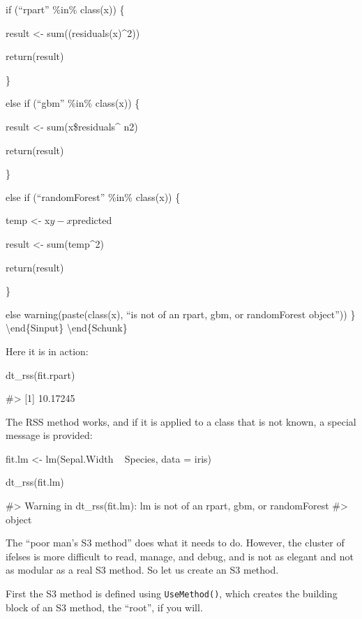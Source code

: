 if (``rpart'' \%in\% class(x)) \{

result \textless{}- sum((residuals(x)\^{}2))

return(result)

\}

else if (``gbm'' \%in\% class(x)) \{

result \textless{}- sum(x\$residuals\^{} n2)

return(result)

\}

else if (``randomForest'' \%in\% class(x)) \{

temp \textless{}- x\(y - x\)predicted

result \textless{}- sum(temp\^{}2)

return(result)

\}

else warning(paste(class(x), ``is not of an rpart, gbm, or randomForest
object'')) \} \textbackslash{}end\{Sinput\}
\textbackslash{}end\{Schunk\}

Here it is in action:

\begin{Schunk}
\begin{Sinput}
dt_rss(fit.rpart)
\end{Sinput}
\begin{Soutput}
#> [1] 10.17245
\end{Soutput}
\end{Schunk}

The RSS method works, and if it is applied to a class that is not known,
a special message is provided:

\begin{Schunk}
\begin{Sinput}
fit.lm <- lm(Sepal.Width ~ Species, data = iris)

dt_rss(fit.lm)
\end{Sinput}
\begin{Soutput}
#> Warning in dt_rss(fit.lm): lm is not of an rpart, gbm, or randomForest
#> object
\end{Soutput}
\end{Schunk}

The ``poor man's S3 method'' does what it needs to do. However, the
cluster of ifelses is more difficult to read, manage, and debug, and is
not as elegant and not as modular as a real S3 method. So let us create
an S3 method.

First the S3 method is defined using \texttt{UseMethod()}, which creates
the building block of an S3 method, the ``root'', if you will.


